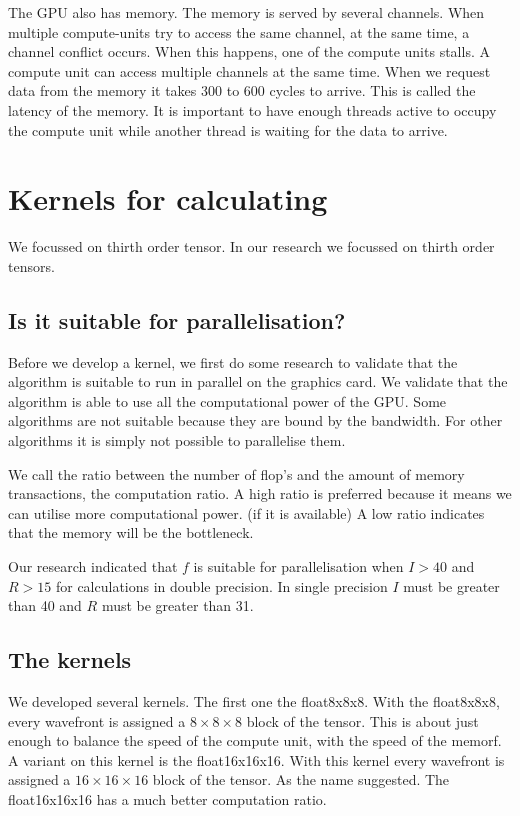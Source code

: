 \documentclass[11pt]{IEEEtran}
\begin{document}
The GPU also has memory. The memory is served by several channels. When multiple compute-units try to access the same channel, at the same time, a channel conflict occurs. When this happens, one of the compute units stalls. A compute unit can access multiple channels at the same time. When we request data from the memory it takes 300 to 600 cycles to arrive. This is called the latency of the memory. It is important to have enough threads active to occupy the compute unit while another thread is waiting for the data to arrive.

\section{Kernels for calculating \FF{}}
We focussed on thirth order tensor. In our research we focussed on thirth order tensors.

\subsection{Is it suitable for parallelisation?}
Before we develop a kernel, we first do some research to validate that the algorithm is suitable to run in parallel on the graphics card. We validate that the algorithm is able to use all the computational power of the GPU. Some algorithms are not suitable because they are bound by the bandwidth. For other algorithms it is simply not possible to parallelise them.

We call the ratio between the number of flop's and the amount of memory transactions, the computation ratio. A high ratio is preferred because it means we can utilise more computational power. (if it is available) A low ratio indicates that the memory will be the bottleneck.

Our research indicated that $f$ is suitable for parallelisation when $I > 40$ and $R > 15$ for calculations in double precision. In single precision $I$ must be greater than 40 and $R$ must be greater than 31.

\subsection{The kernels}
 We developed several kernels. The first one the float8x8x8. With the float8x8x8, every wavefront is assigned a $8 \times 8 \times 8$ block of the tensor. This is about just enough to balance the speed of the compute unit, with the speed of the memorf. A variant on this kernel is the float16x16x16. With this kernel every wavefront is assigned a $16 \times 16 \times 16$ block of the tensor. As the name suggested. The float16x16x16 has a much better computation ratio.
 
\end{document}
